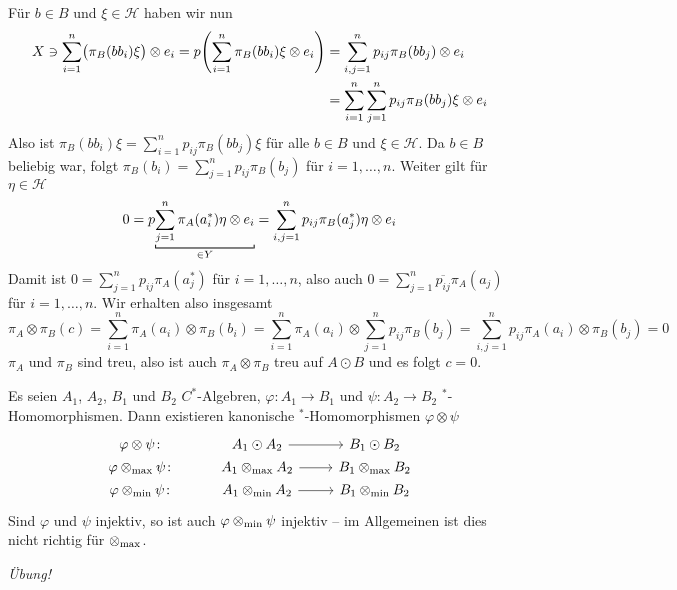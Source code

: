 \begin{beweis}
	Für $b \in B$ und $\xi \in \mathcal{H}$ haben wir nun
	\begin{align}
		X \ni \sum_{i=1}^{n} \enbrace[\big]{\pi_B(bb_i) \xi} \otimes e_i = p \enbrace*{\sum_{i=1}^{n} \pi_B(bb_i) \xi \otimes e_i} &= \sum_{i,j=1}^n p_{ij} \pi_B(bb_j) \otimes e_i \\
		&= \sum_{i=1}^{n} \sum_{j=1}^{n} p_{ij} \pi_B(bb_j) \xi \otimes e_i
	\end{align}
	Also ist $\pi_B(bb_i)\xi = \sum_{i=1}^{n} p_{ij} \pi_B(bb_j) \xi$ für alle $b \in B$ und $\xi \in \mathcal{H}$.
	Da $b \in B$ beliebig war, folgt $\pi_B(b_i) = \sum_{j=1}^{n}  p_{ij} \pi_B(b_j)$ für $i=1,\ldots ,n$.
	Weiter gilt für $\eta \in \mathcal{H}$
	\[
		0 = p \Underbracket{\sum_{j=1}^{n} \pi_A(a_i^*) \eta \otimes e_i}{\in Y} = \sum_{i,j=1}^{n} p_{ij} \pi_B(a_j^*) \eta \otimes e_i
	\]
	Damit ist $0 = \sum_{j=1}^{n} p_{ij} \pi_A(a_j^*)$ für $i=1,\ldots ,n$, also auch $0 = \sum_{j=1}^{n} \overline{p_{ij}} \pi_A(a_j)$ für $i=1,\ldots ,n$.
	Wir erhalten also insgesamt
	\[
		\pi_A \otimes \pi_B(c) = \sum_{i=1}^{n} \pi_A(a_i) \otimes \pi_B(b_i) = \sum_{i=1}^{n} \pi_A(a_i) \otimes  \sum_{j=1}^{n} p_{ij} \pi_B(b_j) = \sum_{i,j=1}^{n} p_{ij} \pi_A(a_i) \otimes \pi_B(b_j) =0
	\]
	$\pi_A$ und $\pi_B$ sind treu, also ist auch $\pi_A \otimes \pi_B$ treu auf $A \odot B$ und es folgt $c=0$.
\end{beweis}

\begin{proposition}[label=prop:125]
	Es seien $A_1$, $A_2$, $B_1$ und $B_2$ $C^*$-Algebren, $\varphi \colon A_1 \to B_1$ und $\psi \colon A_2 \to B_2$ $^*$-Homomorphismen.
	Dann existieren kanonische $^*$-Homomorphismen $\varphi \otimes \psi$
	\[
		\begin{tikzcd}[row sep=0pt]
			\varphi \otimes \psi \colon & A_1 \odot A_2 \rar & B_1 \odot B_2 \\
			\varphi \tensormax  \psi \colon & A_1 \tensormax  A_2 \rar & B_1 \tensormax  B_2 \\
			\varphi \tensormin  \psi \colon & A_1 \tensormin  A_2 \rar & B_1 \tensormin  B_2
		\end{tikzcd}
	\]
	Sind $\varphi$ und $\psi$ injektiv, so ist auch $\varphi \mathbin{\otimes_{\min}} \psi$ injektiv -- im Allgemeinen ist dies nicht richtig für $\mathbin{\otimes_{\max}}$.
\end{proposition}
\begin{beweis}
	\emph{Übung!}
\end{beweis}
\newpage

